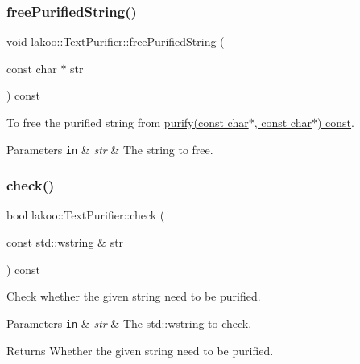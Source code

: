 \subsubsection{\texorpdfstring{free\+Purified\+String()}{freePurifiedString()}\hspace{0.1cm}{\footnotesize\ttfamily [2/2]}}
{\footnotesize\ttfamily void lakoo\+::\+Text\+Purifier\+::free\+Purified\+String (\begin{DoxyParamCaption}\item[{const char $\ast$}]{str }\end{DoxyParamCaption}) const}



To free the purified string from \hyperlink{classlakoo_1_1_text_purifier_aacd5ea50d3d7cb6e800e40252fbc617b}{purify(const char$\ast$, const char$\ast$) const}. 


\begin{DoxyParams}[1]{Parameters}
\mbox{\tt in}  & {\em str} & The string to free. \\
\hline
\end{DoxyParams}
\mbox{\label{classlakoo_1_1_text_purifier_a243df60bae7d8d98a289dbe5c0f85e89}} 
\subsubsection{\texorpdfstring{check()}{check()}\hspace{0.1cm}{\footnotesize\ttfamily [1/4]}}
{\footnotesize\ttfamily bool lakoo\+::\+Text\+Purifier\+::check (\begin{DoxyParamCaption}\item[{const std\+::wstring \&}]{str }\end{DoxyParamCaption}) const}



Check whether the given string need to be purified. 


\begin{DoxyParams}[1]{Parameters}
\mbox{\tt in}  & {\em str} & The std\+::wstring to check. \\
\hline
\end{DoxyParams}
\begin{DoxyReturn}{Returns}
Whether the given string need to be purified. 
\end{DoxyReturn}
\mbox{\label{classlakoo_1_1_text_purifier_a7448ae6b4505878099d20e18ad410189}} 
